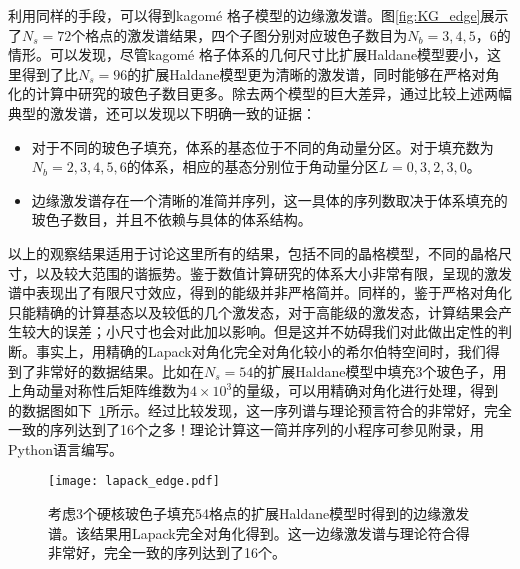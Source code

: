 利用同样的手段，可以得到kagom\'{e} 格子模型的边缘激发谱。图\ref{fig:KG_edge}展示了$N_s=72$个格点的激发谱结果，四个子图分别对应玻色子数目为$N_b = 3,4,5，6$的情形。可以发现，尽管kagom\'{e} 格子体系的几何尺寸比扩展Haldane模型要小，这里得到了比$N_s=96$的扩展Haldane模型更为清晰的激发谱，同时能够在严格对角化的计算中研究的玻色子数目更多。除去两个模型的巨大差异，通过比较上述两幅典型的激发谱，还可以发现以下明确一致的证据：
\begin{itemize}
\item 对于不同的玻色子填充，体系的基态位于不同的角动量分区。对于填充数为$N_b=2,3,4,5,6$的体系，相应的基态分别位于角动量分区$L=0,3,2,3,0$。
\item 边缘激发谱存在一个清晰的准简并序列，这一具体的序列数取决于体系填充的玻色子数目，并且不依赖与具体的体系结构。
\end{itemize}
以上的观察结果适用于讨论这里所有的结果，包括不同的晶格模型，不同的晶格尺寸，以及较大范围的谐振势。鉴于数值计算研究的体系大小非常有限，呈现的激发谱中表现出了有限尺寸效应，得到的能级并非严格简并。同样的，鉴于严格对角化只能精确的计算基态以及较低的几个激发态，对于高能级的激发态，计算结果会产生较大的误差；小尺寸也会对此加以影响。但是这并不妨碍我们对此做出定性的判断。事实上，用精确的Lapack对角化完全对角化较小的希尔伯特空间时，我们得到了非常好的数据结果。比如在$N_s=54$的扩展Haldane模型中填充3个玻色子，用上角动量对称性后矩阵维数为$4\times10^3$的量级，可以用精确对角化进行处理，得到的数据图如下~\ref{fig:lapack_edge}所示。经过比较发现，这一序列谱与理论预言符合的非常好，完全一致的序列达到了16个之多！理论计算这一简并序列的小程序可参见附录，用Python语言编写。

\begin{figure}[!htb]
  \centering
  \texttt{[image: lapack\_edge.pdf]}
  \caption{考虑3个硬核玻色子填充54格点的扩展Haldane模型时得到的边缘激发谱。该结果用Lapack完全对角化得到。这一边缘激发谱与理论符合得非常好，完全一致的序列达到了16个。}
\label{fig:lapack_edge}
\end{figure}





